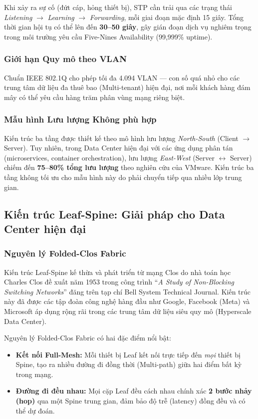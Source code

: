 Khi xảy ra sự cố (đứt cáp, hỏng thiết bị), STP cần trải qua các trạng thái \textit{Listening} $\rightarrow$ \textit{Learning} $\rightarrow$ \textit{Forwarding}, mỗi giai đoạn mặc định 15 giây. Tổng thời gian hội tụ có thể lên đến \textbf{30--50 giây}, gây gián đoạn dịch vụ nghiêm trọng trong môi trường yêu cầu Five-Nines Availability (99,999\% uptime).

\subsubsection{Giới hạn Quy mô theo VLAN}

Chuẩn IEEE 802.1Q cho phép tối đa 4.094 VLAN — con số quá nhỏ cho các trung tâm dữ liệu đa thuê bao (Multi-tenant) hiện đại, nơi mỗi khách hàng đám mây có thể yêu cầu hàng trăm phân vùng mạng riêng biệt.

\subsubsection{Mẫu hình Lưu lượng Không phù hợp}

Kiến trúc ba tầng được thiết kế theo mô hình lưu lượng \textit{North-South} (Client $\rightarrow$ Server). Tuy nhiên, trong Data Center hiện đại với các ứng dụng phân tán (microservices, container orchestration), lưu lượng \textit{East-West} (Server $\leftrightarrow$ Server) chiếm đến \textbf{75--80\% tổng lưu lượng} theo nghiên cứu của VMware. Kiến trúc ba tầng không tối ưu cho mẫu hình này do phải chuyển tiếp qua nhiều lớp trung gian.

\subsection{Kiến trúc Leaf-Spine: Giải pháp cho Data Center hiện đại}

\subsubsection{Nguyên lý Folded-Clos Fabric}

Kiến trúc Leaf-Spine kế thừa và phát triển từ mạng Clos do nhà toán học Charles Clos đề xuất năm 1953 trong công trình ``\textit{A Study of Non-Blocking Switching Networks}'' đăng trên tạp chí Bell System Technical Journal. Kiến trúc này đã được các tập đoàn công nghệ hàng đầu như Google, Facebook (Meta) và Microsoft áp dụng rộng rãi trong các trung tâm dữ liệu siêu quy mô (Hyperscale Data Center).

Nguyên lý Folded-Clos Fabric có hai đặc điểm nổi bật:
\begin{itemize}
    \item \textbf{Kết nối Full-Mesh:} Mỗi thiết bị Leaf kết nối trực tiếp đến \textit{mọi} thiết bị Spine, tạo ra nhiều đường đi đồng thời (Multi-path) giữa hai điểm bất kỳ trong mạng.
    \item \textbf{Đường đi đều nhau:} Mọi cặp Leaf đều cách nhau chính xác \textbf{2 bước nhảy (hop)} qua một Spine trung gian, đảm bảo độ trễ (latency) đồng đều và có thể dự đoán.
\end{itemize}

